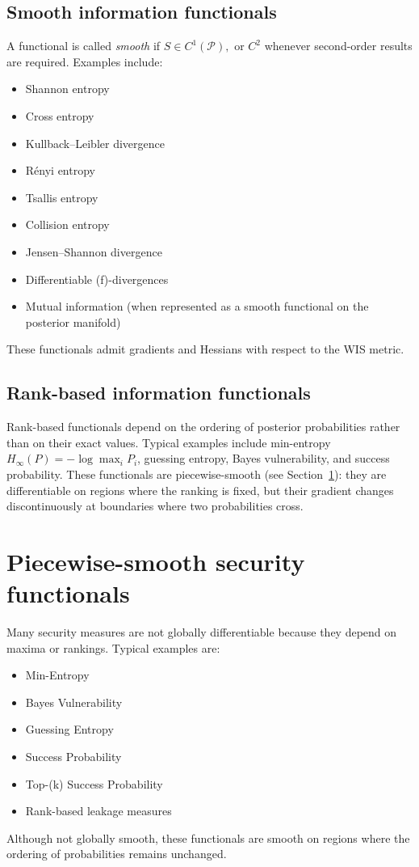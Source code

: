 \subsection{Smooth information functionals}\label{ch:sec:smooth-information-functionals}
A functional is called \textit{smooth} if
$S\in C^1(\mathcal P),$
or \(C^{2}\) whenever second-order results are required.
Examples include:
\begin{itemize}
\item Shannon entropy
\item Cross entropy
\item Kullback--Leibler divergence
\item R\'enyi entropy
\item Tsallis entropy
\item Collision entropy
\item Jensen--Shannon divergence
\item Differentiable (f)-divergences
\item Mutual information (when represented as a smooth functional on the
    posterior manifold)
\end{itemize}
These functionals admit gradients and Hessians with respect to the WIS
metric.

\subsection{Rank-based information functionals}\label{ch:sec:rank-based-information-functionals}
Rank-based functionals depend on the ordering of posterior probabilities rather than on their exact values.  Typical examples include min-entropy $H_\infty(P)=-\log\max_i P_i$, guessing entropy, Bayes vulnerability, and success probability.  These functionals are piecewise-smooth (see Section~\ref{ch:sec:piecewise-smooth-security-functionals}): they are differentiable on regions where the ranking is fixed, but their gradient changes discontinuously at boundaries where two probabilities cross.
\section{Piecewise-smooth security functionals}\label{ch:sec:piecewise-smooth-security-functionals}
Many security measures are not globally differentiable because they
depend on maxima or rankings.
Typical examples are:
\begin{itemize}
\item Min-Entropy
\item Bayes Vulnerability
\item Guessing Entropy
\item Success Probability
\item Top-(k) Success Probability
\item Rank-based leakage measures
\end{itemize}
Although not globally smooth, these functionals are smooth on regions
where the ordering of probabilities remains unchanged.

